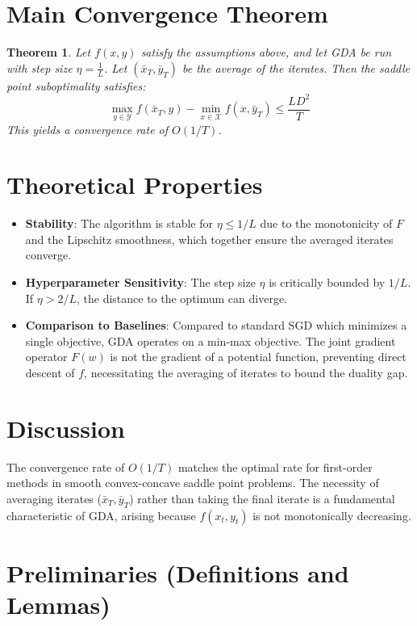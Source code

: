 \documentclass{article}
\newtheorem{theorem}{Theorem}
\begin{document}
\section*{Main Convergence Theorem}
\begin{theorem}
Let $f(x,y)$ satisfy the assumptions above, and let GDA be run with step size $\eta = \frac{1}{L}$. Let $(\bar{x}_T, \bar{y}_T)$ be the average of the iterates. Then the saddle point suboptimality satisfies:
$$ \max_{y \in \mathcal{Y}} f(\bar{x}_T, y) - \min_{x \in \mathcal{X}} f(x, \bar{y}_T) \leq \frac{L D^2}{T} $$
This yields a convergence rate of $O(1/T)$.
\end{theorem}

\section*{Theoretical Properties}
\begin{itemize}
\item \textbf{Stability}: The algorithm is stable for $\eta \leq 1/L$ due to the monotonicity of $F$ and the Lipschitz smoothness, which together ensure the averaged iterates converge.
\item \textbf{Hyperparameter Sensitivity}: The step size $\eta$ is critically bounded by $1/L$. If $\eta > 2/L$, the distance to the optimum can diverge.
\item \textbf{Comparison to Baselines}: Compared to standard SGD which minimizes a single objective, GDA operates on a min-max objective. The joint gradient operator $F(w)$ is not the gradient of a potential function, preventing direct descent of $f$, necessitating the averaging of iterates to bound the duality gap.
\end{itemize}

\section*{Discussion}
The convergence rate of $O(1/T)$ matches the optimal rate for first-order methods in smooth convex-concave saddle point problems. The necessity of averaging iterates ($\bar{x}_T, \bar{y}_T$) rather than taking the final iterate is a fundamental characteristic of GDA, arising because $f(x_t, y_t)$ is not monotonically decreasing.

\newpage
\section*{Preliminaries (Definitions and Lemmas)}
\end{document}
